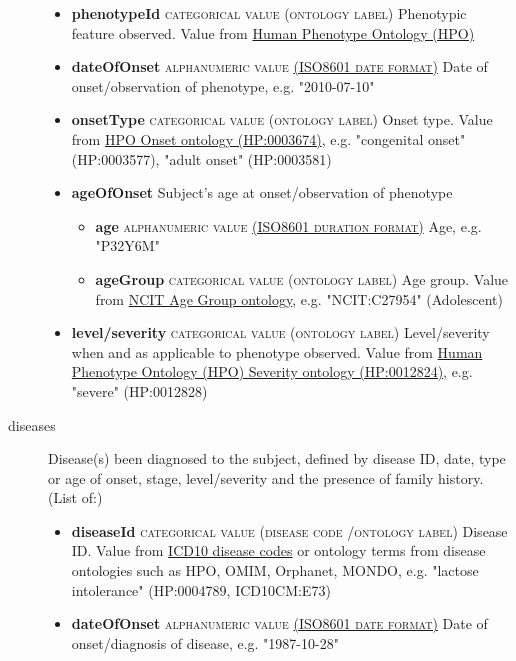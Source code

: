 \documentclass[a4paper, 10pt]{article}        %
\begin{document}
\begin{description}
	\begin{itemize}
			\item[] \textbf{phenotypeId} {\textsc{categorical value (ontology label)}} Phenotypic feature observed. Value from \href{http:purl.obolibrary.org/obo/HP_0000001}{Human Phenotype Ontology (HPO)} 
			\item[] \textbf{dateOfOnset} {\textsc{alphanumeric value \href{https://www.iso.org/iso-8601-date-and-time-format.html}{(ISO8601 date format)}}} Date of onset/observation of phenotype, e.g. "2010-07-10"
			\item[] \textbf{onsetType} {\textsc{categorical value (ontology label)}}
 Onset type. Value from \href{http://purl.obolibrary.org/obo/HP_0003674}{HPO Onset ontology (HP:0003674)}, e.g. "congenital onset" (HP:0003577), "adult onset" (HP:0003581)
  			\item[] \textbf{ageOfOnset} Subject's age at onset/observation of phenotype
			\begin{itemize}
 			\item[] \textbf{age} {\textsc{alphanumeric value \href{https://www.iso.org/iso-8601-date-and-time-format.html}{(ISO8601 duration format)}}} Age, e.g. "P32Y6M"
			\item[] \textbf{ageGroup} {\textsc{categorical value (ontology label)}} Age group. Value from \href{https://www.ebi.ac.uk/ols/ontologies/ncit/terms?iri=http%3A%2F%2Fpurl.obolibrary.org%2Fobo%2FNCIT_C20587}{NCIT Age Group ontology}, e.g. "NCIT:C27954" (Adolescent)
			\end{itemize}
			\item[] \textbf{level/severity}  {\textsc{categorical value (ontology label)}} Level/severity when and as applicable to phenotype observed. Value from \href{http://purl.obolibrary.org/obo/HP_0012824}{Human Phenotype Ontology (HPO) Severity ontology (HP:0012824)}, e.g. "severe" (HP:0012828)
	\end{itemize}
	\item[diseases] Disease(s) been diagnosed to the subject, defined by disease ID, date, type or age of onset, stage, level/severity and the presence of family history. (List of:)
	\begin{itemize}
			\item[]  \textbf{diseaseId} {\textsc{categorical value (disease code /ontology label)}} Disease ID. Value from \href{https://www.who.int/classifications/icd/en/}{ICD10 disease codes} or ontology terms from disease ontologies such as HPO, OMIM, Orphanet, MONDO, e.g. "lactose intolerance" (HP:0004789, ICD10CM:E73)
			\item[] \textbf{dateOfOnset} {\textsc{alphanumeric value \href{https://www.iso.org/iso-8601-date-and-time-format.html}{(ISO8601 date format)}}} Date of onset/diagnosis of disease, e.g. "1987-10-28"

\end{itemize}
\end{description}
\end{document}
